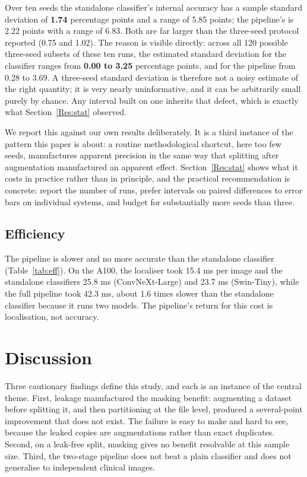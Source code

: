 \documentclass{elektr}
\begin{document}
Over ten seeds the standalone classifier's internal accuracy has a sample standard deviation of
\textbf{1.74} percentage points and a range of 5.85 points; the pipeline's is 2.22 points with a range
of 6.83. Both are far larger than the three-seed protocol reported (0.75 and 1.02). The reason is
visible directly: across all 120 possible three-seed subsets of these ten runs, the estimated standard
deviation for the classifier ranges from \textbf{0.00 to 3.25} percentage points, and for the pipeline
from 0.28 to 3.69. A three-seed standard deviation is therefore not a noisy estimate of the right
quantity; it is very nearly uninformative, and it can be arbitrarily small purely by chance. Any
interval built on one inherits that defect, which is exactly what Section~\ref{Res:stat} observed.

We report this against our own results deliberately. It is a third instance of the pattern this paper is
about: a routine methodological shortcut, here too few seeds, manufactures apparent precision in the same
way that splitting after augmentation manufactured an apparent effect. Section~\ref{Res:stat} shows what
it costs in practice rather than in principle, and the practical recommendation is concrete: report the
number of runs, prefer intervals on paired differences to error bars on individual systems, and budget
for substantially more seeds than three.

\subsection{Efficiency}
\label{Res:eff}
The pipeline is slower and no more accurate than the standalone classifier (Table~\ref{tab:eff}). On the A100, the localiser took 15.4 ms per image and the standalone classifiers 25.8 ms (ConvNeXt-Large) and 23.7 ms (Swin-Tiny), while the full pipeline took 42.3 ms, about 1.6 times slower than the standalone classifier because it runs two models. The pipeline's return for this cost is localisation, not accuracy.


\section{Discussion}
\label{Dis}
Three cautionary findings define this study, and each is an instance of the central theme. First, leakage manufactured the masking benefit: augmenting a dataset before splitting it, and then partitioning at the file level, produced a several-point improvement that does not exist. The failure is easy to make and hard to see, because the leaked copies are augmentations rather than exact duplicates. Second, on a leak-free split, masking gives no benefit resolvable at this sample size. Third, the two-stage pipeline does not beat a plain classifier and does not generalise to independent clinical images.
\end{document}
